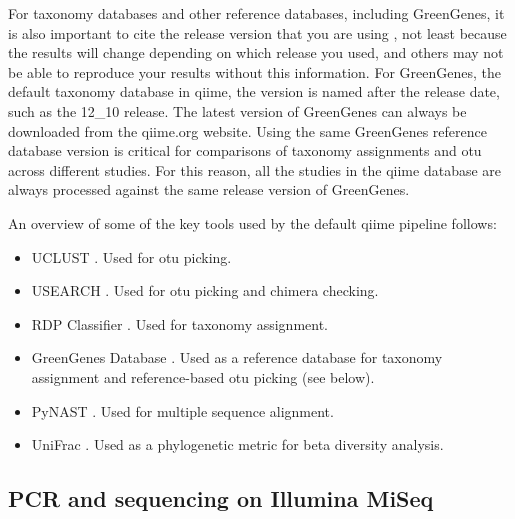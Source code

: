 For taxonomy databases and other reference databases, including GreenGenes, it is also
important to cite the release version that you are using \cite{DeSantis2006}, not least
because the results will change depending on which release you used, and others may not
be able to reproduce your results without this information. For GreenGenes, the default
taxonomy database in \gls{qiime}, the version is named after the release date, such as
the 12\_10 release. The latest version of GreenGenes can always be downloaded from the
qiime.org website. Using the same GreenGenes reference database version is critical for
comparisons of taxonomy assignments and \gls{otu} across different studies. For this
reason, all the studies in the \gls{qiime} database are always processed against the
same release version of GreenGenes.

An overview of some of the key tools used by the default \gls{qiime} pipeline follows:

\begin{itemize}
    \item UCLUST \cite{Edgar2010}. Used for \gls{otu} picking.
    \item USEARCH \cite{Edgar2010}. Used for \gls{otu} picking and chimera checking.
    \item RDP Classifier \cite{Wang2007}. Used for taxonomy assignment.
    \item GreenGenes Database \cite{DeSantis2006}. Used as a reference database for taxonomy assignment and reference-based \gls{otu} picking (see below).
    \item PyNAST \cite{Caporaso2010PyNAST}. Used for multiple sequence alignment.
    \item UniFrac \cite{Lozupone2005}. Used as a phylogenetic metric for beta diversity analysis.
\end{itemize}

\subsection{PCR and sequencing on Illumina MiSeq}

